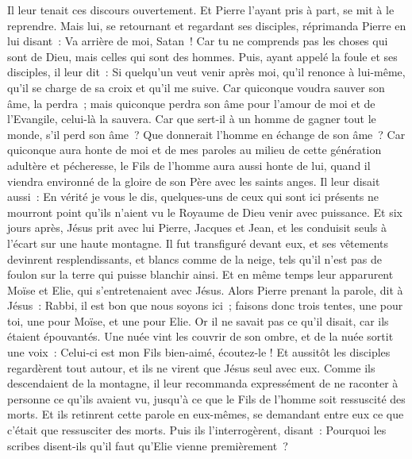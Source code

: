 \begin{multicols}{2}
Il leur tenait ces discours ouvertement. Et Pierre l'ayant pris à part, se mit à le reprendre.
Mais lui, se retournant et regardant ses disciples, réprimanda Pierre en lui disant~: Va arrière de moi, Satan~! Car tu ne comprends pas les choses qui sont de Dieu, mais celles qui sont des hommes.
Puis, ayant appelé la foule et ses disciples, il leur dit~: Si quelqu'un veut venir après moi, qu'il renonce à lui-même, qu'il se charge de sa croix et qu'il me suive.
Car quiconque voudra sauver son âme, la perdra~; mais quiconque perdra son âme pour l'amour de moi et de l'Evangile, celui-là la sauvera.
Car que sert-il à un homme de gagner tout le monde, s'il perd son âme~?
Que donnerait l'homme en échange de son âme~?
Car quiconque aura honte de moi et de mes paroles au milieu de cette génération adultère et pécheresse, le Fils de l'homme aura aussi honte de lui, quand il viendra environné de la gloire de son Père avec les saints anges.
\VerseOne{}Il leur disait aussi~: En vérité je vous le dis, quelques-uns de ceux qui sont ici présents ne mourront point qu'ils n'aient vu le Royaume de Dieu venir avec puissance.
Et six jours après, Jésus prit avec lui Pierre, Jacques et Jean, et les conduisit seuls à l'écart sur une haute montagne. Il fut transfiguré devant eux,
et ses vêtements devinrent resplendissants, et blancs comme de la neige, tels qu'il n'est pas de foulon sur la terre qui puisse blanchir ainsi.
Et en même temps leur apparurent Moïse et Elie, qui s'entretenaient avec Jésus.
Alors Pierre prenant la parole, dit à Jésus~: Rabbi, il est bon que nous soyons ici~; faisons donc trois tentes, une pour toi, une pour Moïse, et une pour Elie.
Or il ne savait pas ce qu'il disait, car ils étaient épouvantés.
Une nuée vint les couvrir de son ombre, et de la nuée sortit une voix~: Celui-ci est mon Fils bien-aimé, écoutez-le !
Et aussitôt les disciples regardèrent tout autour, et ils ne virent que Jésus seul avec eux.
Comme ils descendaient de la montagne, il leur recommanda expressément de ne raconter à personne ce qu'ils avaient vu, jusqu'à ce que le Fils de l'homme soit ressuscité des morts.
Et ils retinrent cette parole en eux-mêmes, se demandant entre eux ce que c'était que ressusciter des morts.
Puis ils l'interrogèrent, disant~: Pourquoi les scribes disent-ils qu'il faut qu'Elie vienne premièrement~?

\end{multicols}
